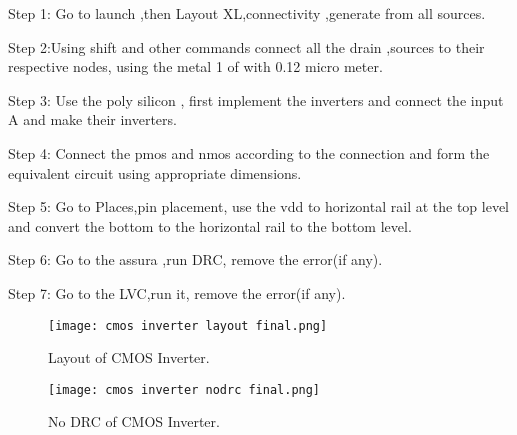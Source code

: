 \documentclass[conference]{IEEEtran}
\begin{document}
 Step 1: Go to launch ,then Layout XL,connectivity ,generate from all sources.

Step 2:Using shift and other commands connect all the drain ,sources to their 
    respective nodes, using the metal 1 of with 0.12 micro meter.

Step 3: Use the poly silicon , first implement the inverters and connect the input A and make their inverters. 

Step 4: Connect the pmos and nmos according to the connection and form the equivalent circuit using appropriate dimensions.

Step 5: Go to Places,pin placement, use the vdd to horizontal rail at the top level and convert the bottom to the horizontal rail to the bottom level.

Step 6: Go to the assura ,run DRC, remove the error(if any).

Step 7: Go to the LVC,run it, remove the error(if any).

 \begin{figure}[h] %
    \centering
    \texttt{[image: cmos inverter layout final.png]} %
    \caption{Layout of CMOS Inverter.} %
     
\end{figure}

 \begin{figure}[h] %
    \centering
    \texttt{[image: cmos inverter nodrc final.png]} %
    \caption{No DRC of CMOS Inverter.} %
     
\end{figure}
\end{document}
